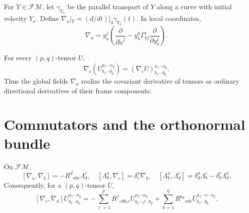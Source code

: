 \begin{definition}
\label{def:chow-ii-horizontal-frame-fields}
For $Y\in\mathcal F\mathcal M$, let $\gamma_{Y_a}$ be the parallel transport
of $Y$ along a curve with initial velocity $Y_a$.  Define
$\nabla_a|_Y=(d/dt)|_{0}\gamma_{Y_a}(t)$.  In local coordinates,
\[
 \nabla_a=y_a^j\left(\frac{\partial}{\partial \widetilde x^j}
 -y_b^k\Gamma^i_{kj}\frac{\partial}{\partial y_b^i}\right).
\]
\end{definition}

\begin{lemma}
\label{lem:chow-ii-horizontal-covariant-differentiation}
For every $(p,q)$-tensor $U$,
\[
 \nabla_c\!\left(U^{a_1\cdots a_q}_{b_1\cdots b_p}\right)
 =(\nabla_cU)^{a_1\cdots a_q}_{b_1\cdots b_p}.
\]
Thus the global fields $\nabla_a$ realize the covariant derivative of tensors
as ordinary directional derivatives of their frame components.
\end{lemma}

\section{Commutators and the orthonormal bundle}

\begin{lemma}
\label{lem:chow-ii-frame-bundle-commutators}
On $\mathcal F\mathcal M$,
\[
 [\nabla_a,\nabla_b]=-R^d{}_{abc}\Lambda^c_d,
\quad [\Lambda^a_b,\nabla_c]=\delta^a_c\nabla_b,
\quad [\Lambda^a_b,\Lambda^c_d]=\delta^a_d\Lambda^c_b-\delta^c_b\Lambda^a_d.
\]
Consequently, for a $(p,q)$-tensor $U$,
\[
 [\nabla_c,\nabla_d]U^{a_1\cdots a_q}_{b_1\cdots b_p}
 =-\sum_{\ell=1}^pR^f{}_{cdb_\ell e}U^{a_1\cdots a_q}_{b_1\cdots f\cdots b_p}
 +\sum_{k=1}^qR^{a_k}{}_{cde}U^{a_1\cdots e\cdots a_q}_{b_1\cdots b_p}.
\]
\end{lemma}

